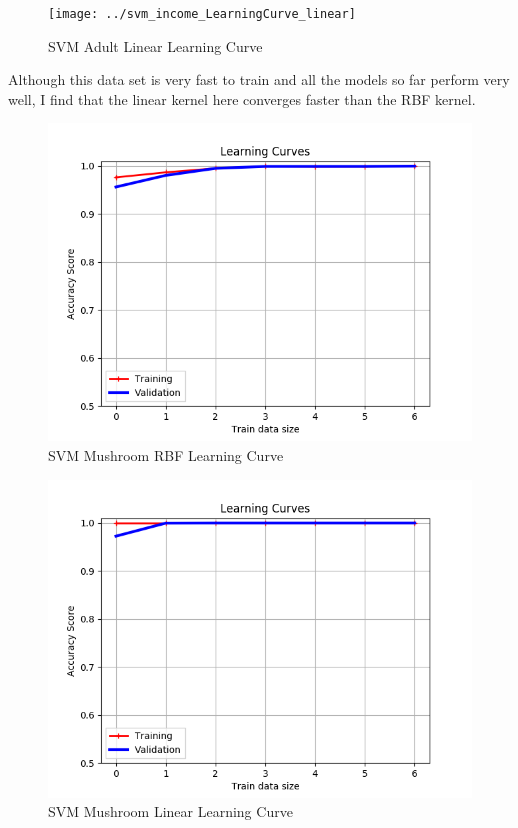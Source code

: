 \documentclass[         %
aps,                    %
prl,                    %
showpacs,               %
superscriptaddress,    %
nofootinbib,            %
twocolumn,             %
showkeys,               %
preprintnumbers,        %
floatfix               %
]{revtex4-1}               %
\begin{document}
\begin{figure}[h!]
  \centering \texttt{[image: ../svm\_income\_LearningCurve\_linear]}
  \caption{SVM Adult Linear Learning Curve\label{fig:svml_lc_adult}}
\end{figure}
Although this data set is very fast to train and all the models so far perform very well, I find that the linear kernel here converges faster than the RBF kernel.
\begin{figure}[h!]
  \centering \includegraphics[width=\linewidth]{../svm_mushroom_LearningCurve_rbf}
  \caption{SVM Mushroom RBF Learning Curve\label{fig:svmrbf_lc_mush}}
\end{figure}

\begin{figure}[h!]
  \centering \includegraphics[width=\linewidth]{../svm_mushroom_LearningCurve_linear}
  \caption{SVM Mushroom Linear Learning Curve\label{fig:svml_lc_mush}}
\end{figure}
\end{document}

